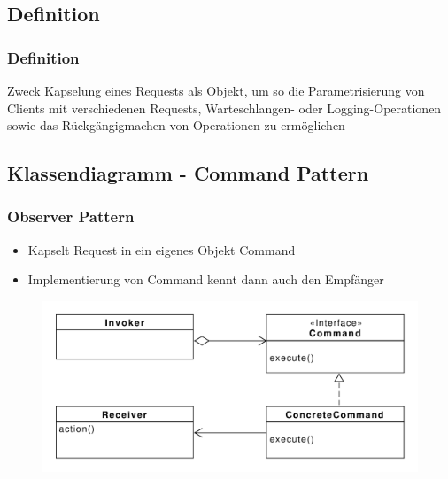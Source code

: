 \subsection{Definition}
\begin{frame}
  \frametitle{Definition}
  \begin{block}{Zweck}
  	Kapselung eines Requests als Objekt, um so die Parametrisierung von Clients mit verschiedenen Requests, Warteschlangen- oder Logging-Operationen sowie das Rückgängigmachen von Operationen zu ermöglichen
  \end{block}
  
\end{frame}

\subsection{Klassendiagramm - Command Pattern}
\begin{frame}
	\frametitle{Observer Pattern}		
	\begin{itemize}
		\item Kapselt Request in ein eigenes Objekt Command
		\item Implementierung von Command kennt dann auch den Empfänger
	\end{itemize}	
  	\begin{figure}
		\includegraphics[scale=.4]{paper/command/command}
	\end{figure}
\end{frame}

